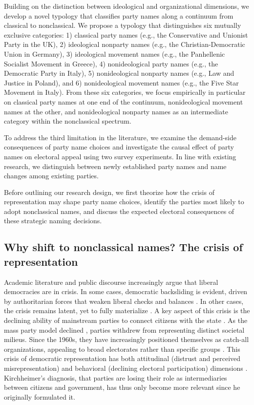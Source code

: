 \documentclass[12pt]{article}
\begin{document}
Building on the distinction between ideological and organizational dimensions, we develop a novel typology that classifies party names along a continuum from classical to nonclassical. We propose a typology that distinguishes six mutually exclusive categories: 1) classical party names (e.g., the Conservative and Unionist Party in the UK), 2) ideological nonparty names (e.g., the Christian-Democratic Union in Germany), 3) ideological movement names (e.g., the Panhellenic Socialist Movement in Greece), 4) nonideological party names (e.g., the Democratic Party in Italy), 5) nonideological nonparty names (e.g., Law and Justice in Poland), and 6) nonideological movement names (e.g., the Five Star Movement in Italy). From these six categories, we focus empirically in particular on classical party names at one end of the continuum, nonideological movement names at the other, and nonideological nonparty names as an intermediate category within the nonclassical spectrum.

To address the third limitation in the literature, we examine the demand-side consequences of party name choices and investigate the causal effect of party names on electoral appeal using two survey experiments. In line with existing research, we distinguish between newly established party names and name changes among existing parties.

Before outlining our research design, we first theorize how the crisis of representation may shape party name choices, identify the parties most likely to adopt nonclassical names, and discuss the expected electoral consequences of these strategic naming decisions.

\subsection{Why shift to nonclassical names? The crisis of representation}

Academic literature and public discourse increasingly argue that liberal democracies are in crisis. In some cases, democratic backsliding is evident, driven by authoritarian forces that weaken liberal checks and balances \citep[e.g.,][]{McCoy_Rahman_Somer_2018, Bohle_Greskovits_Naczyk_2024}. In other cases, the crisis remains latent, yet to fully materialize \citep[e.g.,][]{Valgardsson_Jennings_Stoker_Bunting_Devine_McKay_Klassen_2025}. A key aspect of this crisis is the declining ability of mainstream parties to connect citizens with the state \citep[e.g.,][]{Mair_2013, Schmitter_2001, Katz_Mair_1995}. As the mass party model declined \citep{Duverger_1954}, parties withdrew from representing distinct societal milieus. Since the 1960s, they have increasingly positioned themselves as catch-all organizations, appealing to broad electorates rather than specific groups \citep{Kirchheimer_1966}. This crisis of democratic representation has both attitudinal (distrust and perceived misrepresentation) and behavioral (declining electoral participation) dimensions \citep{Mainwaring_et_al_2006}. Kirchheimer's \citeyearpar{Kirchheimer_1966} diagnosis, that parties are losing their role as intermediaries between citizens and government, has thus only become more relevant since he originally formulated it.
\end{document}
